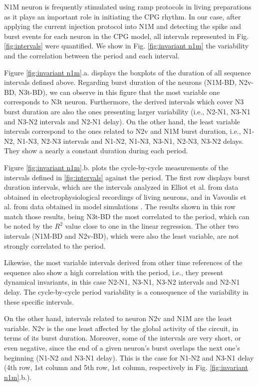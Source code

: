 N1M neuron is frequently stimulated using ramp protocols in living preparations \parencite{elliott_temporal_1991} as it plays an important role in initiating the CPG rhythm. In our case, after applying the current injection protocol into N1M and detecting the spike and burst events for each neuron in the CPG model, all  intervals represented in Fig. \ref{fig:intervals} were quantified. We show in Fig. \ref{fig:invariant n1m} the variability and the correlation between the period and each interval.

Figure \ref{fig:invariant n1m}.a. displays the boxplots of the duration of all sequence intervals defined above. Regarding burst duration of the neurons (N1M-BD, N2v-BD, N3t-BD), we can observe in this figure that the most variable one corresponds to N3t neuron. Furthermore, the derived intervals which cover N3 burst duration are also the ones presenting larger variability (i.e., N2-N1, N3-N1 and N3-N2 intervals and N2-N1 delay). On the other hand, the least variable intervals correspond to the ones related to N2v and N1M burst duration, i.e., N1-N2, N1-N3, N2-N3 intervals and N1-N2, N1-N3, N3-N1, N2-N3, N3-N2 delays. They show a nearly a constant duration during each period.

Figure \ref{fig:invariant n1m}.b. plots the cycle-by-cycle measurements of the intervals defined in \ref{fig:intervals} against the period. The first row displays burst duration intervals, which are the intervals analyzed in Elliot et al. \parencite{elliott_temporal_1991} from data obtained in electrophysiological recordings of living neurons, and in Vavoulis et al. from data obtained in model simulations \parencite{vavoulis_computational_2007}. The results shown in this row match those results, being N3t-BD the most correlated to the period, which can be noted by the $R^2$ value close to one in the linear regression. The other two intervals (N1M-BD and N2v-BD), which were also the least variable, are not strongly correlated to the period. 

Likewise, the most variable intervals derived from other time references of the sequence also show a high correlation with the period, i.e., they present dynamical invariants, in this case N2-N1, N3-N1, N3-N2 intervals and N2-N1 delay. The cycle-by-cycle period variability is a consequence of the variability in these specific intervals.

On the other hand, intervals related to neuron N2v and N1M are the least variable. N2v is the one least affected by the global activity of the circuit, in terms of its burst duration. Moreover, some of the intervals are very short, or even negative, since the end of a given neuron's burst overlaps the next one's beginning (N1-N2 and N3-N1 delay). This is the case for N1-N2 and N3-N1 delay (4th row, 1st column and 5th row, 1st column, respectively in Fig. \ref{fig:invariant n1m}.b.).  


